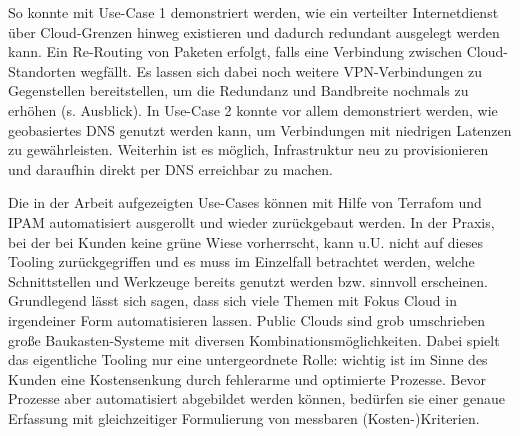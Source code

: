 So konnte mit Use-Case 1 demonstriert werden, wie ein verteilter Internetdienst über Cloud-Grenzen hinweg existieren und dadurch redundant ausgelegt werden kann. Ein Re-Routing von Paketen erfolgt, falls eine Verbindung zwischen Cloud-Standorten wegfällt. Es lassen sich dabei noch weitere VPN-Verbindungen zu Gegenstellen bereitstellen, um die Redundanz und Bandbreite nochmals zu erhöhen (s. Ausblick).
In Use-Case 2 konnte vor allem demonstriert werden, wie geobasiertes DNS genutzt werden kann, um Verbindungen mit niedrigen Latenzen zu gewährleisten. Weiterhin ist es möglich, Infrastruktur neu zu provisionieren und daraufhin direkt per DNS erreichbar zu machen. 

Die in der Arbeit aufgezeigten Use-Cases können mit Hilfe von Terrafom und IPAM automatisiert ausgerollt und wieder zurückgebaut werden. In der Praxis, bei der bei Kunden keine \glqq grüne Wiese\grqq{} vorherrscht, kann u.U. nicht auf dieses Tooling zurückgegriffen und es muss im Einzelfall betrachtet werden, welche Schnittstellen und Werkzeuge bereits genutzt werden bzw. sinnvoll erscheinen. Grundlegend lässt sich sagen, dass sich viele Themen mit Fokus Cloud in irgendeiner Form automatisieren lassen. Public Clouds sind grob umschrieben große \glqq Baukasten-Systeme\grqq{} mit diversen Kombinationsmöglichkeiten. Dabei spielt das eigentliche Tooling nur eine untergeordnete Rolle: wichtig ist im Sinne des Kunden eine Kostensenkung durch fehlerarme und optimierte Prozesse. Bevor Prozesse aber automatisiert abgebildet werden können, bedürfen sie einer genaue Erfassung mit gleichzeitiger Formulierung von messbaren (Kosten-)Kriterien.%

